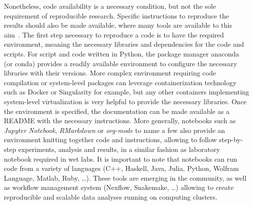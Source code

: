 Nonetheless, code availability is a necessary condition, but not the sole requirement of reproducible research.
Specific instructions to reproduce the results should also be made available, where many tools are available to this aim~\citep{Wilson2014,Darriba2018}.
The first step necessary to reproduce a code is to have the required environment, meaning the necessary libraries and dependencies for the code and scripts.
For script and code written in Python, the package manager anaconda (or conda) provides a readily available environment to configure the necessary libraries with their versions.
More complex environment requiring code compilation or system-level packages can leverage containerization technology such as Docker or Singularity for example, but any other containers implementing system-level virtualization is very helpful to provide the necessary libraries.
Once the environment is specified, the documentation can be made available as a README with the necessary instructions.
More generally, notebooks such as \textit{Jupyter Notebook}, \textit{RMarkdown} or \textit{org-mode} to name a few also provide an environment knitting together code and instructions, allowing to follow step-by-step experiments, analysis and results, in a similar fashion as laboratory notebook required in wet labs.
It is important to note that notebooks can run code from a variety of languages (C++, Haskell, Java, Julia, Python, Wolfram Language, Matlab, Ruby, \ldots).
These tools are emerging in the community, as well as workflow management system (Nexflow, Snakemake, \ldots) allowing to create reproducible and scalable data analyses running on computing clusters.

